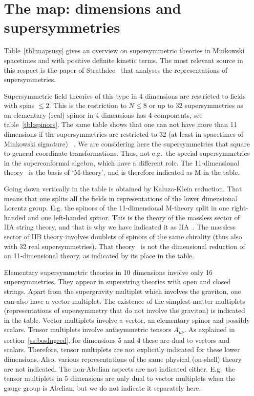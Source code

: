 \documentclass[a4paper,11pt,twoside]{article}
\begin{document}
\section{The map: dimensions and supersymmetries} \label{ss:mapsusy}

Table~\ref{tbl:mapsusy} gives an overview on supersymmetric theories in
Minkowski spacetimes and with positive definite kinetic terms. The most
relevant source in this respect is the paper of
Strathdee~\cite{Strathdee:1987jr} that analyses the representations of
supersymmetries.

Supersymmetric field theories of this type in 4 dimensions are restricted
to fields with spins $\leq 2$. This is the restriction to $N\leq 8$ or up
to 32 supersymmetries as an elementary (real) spinor in 4 dimensions has
4 components, see table~\ref{tbl:spinors}. The same table shows that one
can not have more than 11 dimensions if the supersymmetries are
restricted to 32 (at least in spacetimes of Minkowski
signature)~\cite{Nahm:1978tg} . We are considering here the
supersymmetries that square to general coordinate transformations. Thus,
not e.g.\ the special supersymmetries in the superconformal algebra,
which have a different role. The 11-dimensional
theory~\cite{Cremmer:1978km} is the basis of `M-theory', and is therefore
indicated as M in the table.

Going down vertically in the table is obtained by Kaluza-Klein reduction.
That means that one splits all the fields in representations of the lower
dimensional Lorentz group. E.g. the spinors of the 11-dimensional
M-theory split in one right-handed and one left-handed spinor. This is
the theory of the massless sector of IIA string theory, and that is why
we have indicated it as
IIA~\cite{Campbell:1984zc,Huq:1985im,Giani:1984wc}. The massless sector
of IIB theory involves doublets of spinors of the same chirality (thus
also with 32 real supersymmetries). That
theory~\cite{Schwarz:1983wa,Schwarz:1983qr,Howe:1984sr} is not the
dimensional reduction of an 11-dimensional theory, as indicated by its
place in the table.

Elementary supersymmetric theories in 10 dimensions involve only 16
supersymmetries. They appear in superstring theories with open and closed
strings. Apart from the supergravity multiplet which involves the
graviton, one can also have a vector multiplet. The existence of the
simplest matter multiplets (representations of supersymmetry that do not
involve the graviton) is indicated in the table. Vector multiplets
involve a vector, an elementary spinor and possibly scalars. Tensor
multiplets involve antisymmetric tensors $A_{\mu \nu }$. As explained in
section~\ref{ss:bosIngred}, for dimensions 5 and 4 these are dual to
vectors and scalars. Therefore, tensor multiplets are not explicitly
indicated for these lower dimensions. Also, various representations of
the same physical (on-shell) theory are not indicated. The non-Abelian
aspects are not indicated either. E.g.\ the tensor multiplets in 5
dimensions are only dual to vector multiplets when the gauge group is
Abelian, but we do not indicate it separately here.
\end{document}
